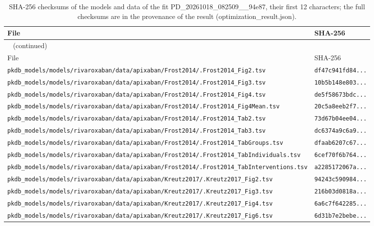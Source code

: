 \documentclass{article}
\begin{document}
\begin{longtable}{ll}
\caption{SHA-256 checksums of the models and data of the fit PD\_20261018\_082509\_\_94e87, their first 12 characters; the full checksums are in the provenance of the result (optimization\_result.json).}\label{tab:checksums:PD_20261018_082509__94e87} \\
\toprule
File & SHA-256 \\
\midrule
\endfirsthead
\multicolumn{2}{l}{\small\tablename~\thetable{} (continued)} \\
\toprule
File & SHA-256 \\
\midrule
\endhead
\bottomrule
\endlastfoot
\texttt{pkdb\_models/models/rivaroxaban/data/apixaban/Frost2014/.Frost2014\_Fig2.tsv} & \texttt{df47c941fd84...} \\
\texttt{pkdb\_models/models/rivaroxaban/data/apixaban/Frost2014/.Frost2014\_Fig3.tsv} & \texttt{10b5b148e803...} \\
\texttt{pkdb\_models/models/rivaroxaban/data/apixaban/Frost2014/.Frost2014\_Fig4.tsv} & \texttt{de5f58673bdc...} \\
\texttt{pkdb\_models/models/rivaroxaban/data/apixaban/Frost2014/.Frost2014\_Fig4Mean.tsv} & \texttt{20c5a8eeb2f7...} \\
\texttt{pkdb\_models/models/rivaroxaban/data/apixaban/Frost2014/.Frost2014\_Tab2.tsv} & \texttt{73d67b04ee04...} \\
\texttt{pkdb\_models/models/rivaroxaban/data/apixaban/Frost2014/.Frost2014\_Tab3.tsv} & \texttt{dc6374a9c6a9...} \\
\texttt{pkdb\_models/models/rivaroxaban/data/apixaban/Frost2014/.Frost2014\_TabGroups.tsv} & \texttt{dfaab6207c67...} \\
\texttt{pkdb\_models/models/rivaroxaban/data/apixaban/Frost2014/.Frost2014\_TabIndividuals.tsv} & \texttt{6cef70f6b764...} \\
\texttt{pkdb\_models/models/rivaroxaban/data/apixaban/Frost2014/.Frost2014\_TabInterventions.tsv} & \texttt{a2285172067a...} \\
\texttt{pkdb\_models/models/rivaroxaban/data/apixaban/Kreutz2017/.Kreutz2017\_Fig2.tsv} & \texttt{94243c590984...} \\
\texttt{pkdb\_models/models/rivaroxaban/data/apixaban/Kreutz2017/.Kreutz2017\_Fig3.tsv} & \texttt{216b03d0818a...} \\
\texttt{pkdb\_models/models/rivaroxaban/data/apixaban/Kreutz2017/.Kreutz2017\_Fig4.tsv} & \texttt{6a6c7f642285...} \\
\texttt{pkdb\_models/models/rivaroxaban/data/apixaban/Kreutz2017/.Kreutz2017\_Fig6.tsv} & \texttt{6d31b7e2bebe...} \\

\end{longtable}
\end{document}
